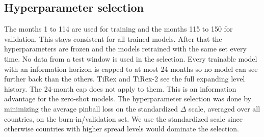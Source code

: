 \subsection{Hyperparameter selection}
\label{sec:exp:hpo}


The months 1 to 114 are used for training and the months 115 to 150 for validation. This stays consistent for all trained models. After that the hyperparameters are frozen and the models retrained with the same set every time. No data from a test window is used in the selection. Every trainable model with an information horizon is capped to at most 24 months so no model can see further back than the others. TiRex and TiRex-2 see the full expanding level history. The 24-month cap does not apply to them. This is an information advantage for the zero-shot models. The hyperparameter selection was done by minimizing the average pinball loss on the standardized $\Delta$ scale, averaged over all countries, on the burn-in/validation set. We use the standardized scale since otherwise countries with higher spread levels would dominate the selection.

